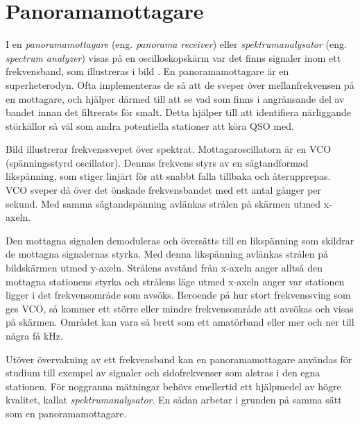 \section{Panoramamottagare}


I en \emph{panoramamottagare} (eng. \emph{panorama receiver}) eller
\emph{spektrumanalysator} (eng. \emph{spectrum analyzer}) visas på en
oscilloskopskärm var det finns signaler inom ett frekvensband, som illustreras
i bild .
En panoramamottagare är en superheterodyn.
Ofta implementeras de så att de sveper över mellanfrekvensen på en mottagare,
och hjälper därmed till att se vad som finns i angränsande del av bandet innan
det filtrerats för smalt.
Detta hjälper till att identifiera närliggande störkällor så väl som andra
potentiella stationer att köra QSO med.


Bild  illustrerar frekvenssvepet över spektrat.
Mottagaroscillatorn är en VCO (spänningsstyrd oscillator).
Dennas frekvens styrs av en sågtandformad likspänning, som stiger linjärt för
att snabbt falla tillbaka och återupprepas.
VCO sveper då över det önskade frekvensbandet med ett antal gånger per sekund.
Med samma sågtandspänning avlänkas strålen på skärmen utmed x-axeln.

Den mottagna signalen demoduleras och översätts till en likspänning
som skildrar de mottagna signalernas styrka.
Med denna likspänning avlänkas strålen på bildskärmen utmed y-axeln.
Strålens avstånd från x-axeln anger alltså den mottagna stationens styrka
och strålens läge utmed x-axeln anger var stationen ligger i det
frekvensområde som avsöks.
Beroende på hur stort frekvenssving som ges VCO, så kommer ett större eller
mindre frekvensområde att avsökas och visas på skärmen.
Området kan vara så brett som ett amatörband eller mer och ner till några
få \si{\kilo\hertz}.

Utöver övervakning av ett frekvensband kan en panoramamottagare användas för
studium till exempel av signaler och sidofrekvenser som alstras i den egna stationen.
För noggranna mätningar behövs emellertid ett hjälpmedel av högre kvalitet,
kallat \emph{spektrumanalysator}.
En sådan arbetar i grunden på samma sätt som en panoramamottagare.

